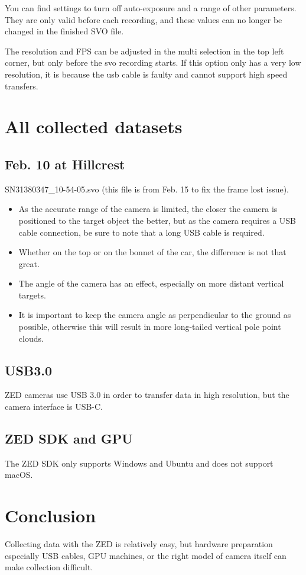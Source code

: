 You can find settings to turn off auto-exposure and a range of other parameters.
They are only valid before each recording, and these values can no longer be changed in the finished SVO file.

The resolution and FPS can be adjusted in the multi selection in the top left corner, but only before the svo recording starts. 
If this option only has a very low resolution, it is because the usb cable is faulty and cannot support high speed transfers.

\section{All collected datasets}
 
\subsection{Feb. 10 at Hillcrest}
 
SN31380347\_10-54-05.svo (this file is from Feb. 15 to fix the frame lost issue).

\renewcommand{\labelitemi}{$\blacksquare$}
\begin{itemize}     
    \item As the accurate range of the camera is limited, the closer the camera is positioned to the target object the better, but as the camera requires a USB cable connection, be sure to note that a long USB cable is required.

    \item Whether on the top or on the bonnet of the car, the difference is not that great.
    
    \item The angle of the camera has an effect, especially on more distant vertical targets.
    
    \item It is important to keep the camera angle as perpendicular to the ground as possible, otherwise this will result in more long-tailed vertical pole point clouds.
\end{itemize}

\subsection{USB3.0}

ZED cameras use USB 3.0 in order to transfer data in high resolution, but the camera interface is USB-C. 

\subsection{ZED SDK and GPU}

The ZED SDK only supports Windows and Ubuntu and does not support macOS. 

\section*{Conclusion}
Collecting data with the ZED is relatively easy, but hardware preparation especially USB cables, GPU machines, or the right model of camera itself can make collection difficult.

